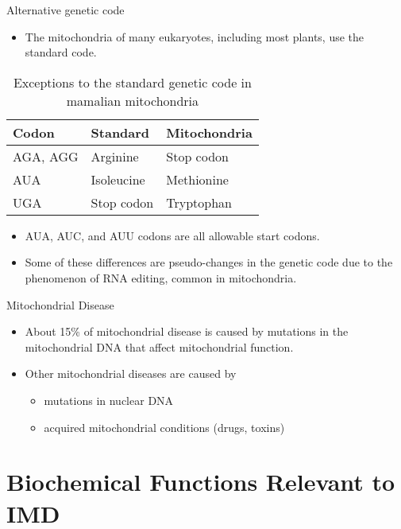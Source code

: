 \documentclass[presentation, smaller]{beamer}
\begin{document}
\begin{frame}[label={sec:org0d7f73b}]{Alternative genetic code}
\begin{itemize}
\item The mitochondria of many eukaryotes, including most plants, use the
standard code.
\end{itemize}

\begin{table}[htbp]
\caption[mito code]{\label{tab:org2778280}
Exceptions to the standard genetic code in mamalian mitochondria}
\centering
\begin{tabular}{lll}
Codon & Standard & Mitochondria\\
\hline
AGA, AGG & Arginine & Stop codon\\
AUA & Isoleucine & Methionine\\
UGA & Stop codon & Tryptophan\\
\end{tabular}
\end{table}

\begin{itemize}
\item AUA, AUC, and AUU codons are all allowable start codons.
\item Some of these differences are pseudo-changes in the genetic code due
to the phenomenon of RNA editing, common in mitochondria.
\end{itemize}
\end{frame}


\begin{frame}[label={sec:orgca42263}]{Mitochondrial Disease}
\begin{itemize}
\item About 15\% of mitochondrial disease is caused by mutations in the
mitochondrial DNA that affect mitochondrial function.
\item Other mitochondrial diseases are caused by
\begin{itemize}
\item mutations  in nuclear DNA
\item acquired mitochondrial conditions (drugs, toxins)
\end{itemize}
\end{itemize}
\end{frame}

\section{Biochemical Functions Relevant to IMD}
\label{sec:org25477c5}
\end{document}
